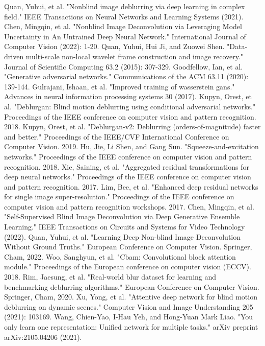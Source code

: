 \begin{sloppypar}
\begin{thebibliography}{27}
	Quan, Yuhui, et al. "Nonblind image deblurring via deep learning in complex field." IEEE Transactions on Neural Networks and Learning Systems (2021).
	Chen, Mingqin, et al. "Nonblind Image Deconvolution via Leveraging Model Uncertainty in An Untrained Deep Neural Network." International Journal of Computer Vision (2022): 1-20.
	Quan, Yuhui, Hui Ji, and Zuowei Shen. "Data-driven multi-scale non-local wavelet frame construction and image recovery." Journal of Scientific Computing 63.2 (2015): 307-329.
	Goodfellow, Ian, et al. "Generative adversarial networks." Communications of the ACM 63.11 (2020): 139-144.
	Gulrajani, Ishaan, et al. "Improved training of wasserstein gans." Advances in neural information processing systems 30 (2017).
	Kupyn, Orest, et al. "Deblurgan: Blind motion deblurring using conditional adversarial networks." Proceedings of the IEEE conference on computer vision and pattern recognition. 2018.
	Kupyn, Orest, et al. "Deblurgan-v2: Deblurring (orders-of-magnitude) faster and better." Proceedings of the IEEE/CVF International Conference on Computer Vision. 2019.
	Hu, Jie, Li Shen, and Gang Sun. "Squeeze-and-excitation networks." Proceedings of the IEEE conference on computer vision and pattern recognition. 2018.
	Xie, Saining, et al. "Aggregated residual transformations for deep neural networks." Proceedings of the IEEE conference on computer vision and pattern recognition. 2017.
	Lim, Bee, et al. "Enhanced deep residual networks for single image super-resolution." Proceedings of the IEEE conference on computer vision and pattern recognition workshops. 2017.
	Chen, Mingqin, et al. "Self-Supervised Blind Image Deconvolution via Deep Generative Ensemble Learning." IEEE Transactions on Circuits and Systems for Video Technology (2022).
	Quan, Yuhui, et al. "Learning Deep Non-blind Image Deconvolution Without Ground Truths." European Conference on Computer Vision. Springer, Cham, 2022.
	Woo, Sanghyun, et al. "Cbam: Convolutional block attention module." Proceedings of the European conference on computer vision (ECCV). 2018.
	Rim, Jaesung, et al. "Real-world blur dataset for learning and benchmarking deblurring algorithms." European Conference on Computer Vision. Springer, Cham, 2020.
	Xu, Yong, et al. "Attentive deep network for blind motion deblurring on dynamic scenes." Computer Vision and Image Understanding 205 (2021): 103169.
	Wang, Chien-Yao, I-Hau Yeh, and Hong-Yuan Mark Liao. "You only learn one representation: Unified network for multiple tasks." arXiv preprint arXiv:2105.04206 (2021).
\end{thebibliography}


\end{sloppypar}
